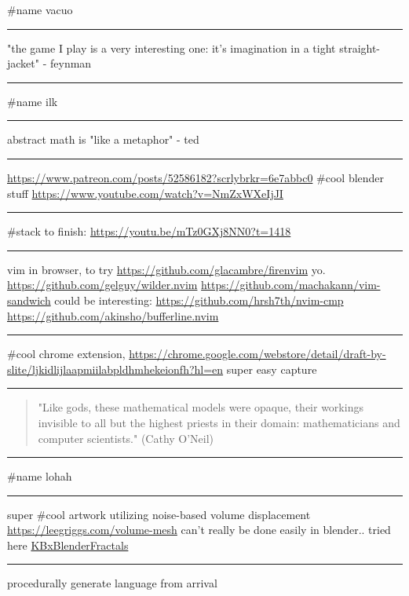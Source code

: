 \documentclass[letterpaper]{article}
\begin{document}
\#name vacuo

\noindent\rule{\textwidth}{0.5pt}

"the game I play is a very interesting one: it's imagination in a tight
straight-jacket" - feynman

\noindent\rule{\textwidth}{0.5pt}

\#name ilk

\noindent\rule{\textwidth}{0.5pt}

abstract math is "like a metaphor" - ted

\noindent\rule{\textwidth}{0.5pt}

\url{https://www.patreon.com/posts/52586182?scrlybrkr=6e7abbc0} \#cool blender
stuff \url{https://www.youtube.com/watch?v=NmZxWXeIjJI}

\noindent\rule{\textwidth}{0.5pt}

\#stack to finish: \url{https://youtu.be/mTz0GXj8NN0?t=1418}

\noindent\rule{\textwidth}{0.5pt}

vim in browser, to try \url{https://github.com/glacambre/firenvim} yo.
\url{https://github.com/gelguy/wilder.nvim}
\url{https://github.com/machakann/vim-sandwich} could be interesting:
\url{https://github.com/hrsh7th/nvim-cmp}
\url{https://github.com/akinsho/bufferline.nvim}

\noindent\rule{\textwidth}{0.5pt}

\#cool chrome extension,
\url{https://chrome.google.com/webstore/detail/draft-by-slite/ljkidlijlaapmiilabpldhmhekeionfh?hl=en}
super easy capture

\noindent\rule{\textwidth}{0.5pt}

\begin{quote}
"Like gods, these mathematical models were opaque, their workings
invisible to all but the highest priests in their domain:
mathematicians and computer scientists." (Cathy O'Neil)
\end{quote}

\noindent\rule{\textwidth}{0.5pt}

\#name lohah

\noindent\rule{\textwidth}{0.5pt}

super \#cool artwork utilizing noise-based volume displacement
\url{https://leegriggs.com/volume-mesh} can't really be done easily in
blender.. tried here \href{KBxBlenderFractals.org}{KBxBlenderFractals}

\noindent\rule{\textwidth}{0.5pt}

procedurally generate language from arrival
\end{document}
